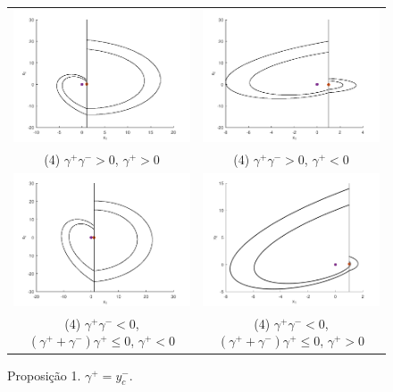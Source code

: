 \begin{figure}[H]
\centering
\begin{table}[H]
\centering
\begin{tabular}{cc}
\includegraphics[width=6cm]{1_4_2_greater}
&
\includegraphics[width=6cm]{1_4_2_lesser}\\
\small(4) $\gamma^+\gamma^->0$, $\gamma^+>0$&\small(4) $\gamma^+\gamma^->0$, $\gamma^+<0$\\
\includegraphics[width=6cm]{1_4_3_plus_negative}
&
\includegraphics[width=6cm]{1_4_3_plus_positive}\\
\small(4) $\gamma^+\gamma^-<0$, $(\gamma^++\gamma^-)\gamma^+\leq0$, $\gamma^+<0$&\small(4) $\gamma^+\gamma^-<0$, $(\gamma^++\gamma^-)\gamma^+\leq0$, $\gamma^+>0$
\end{tabular}
\end{table}
\caption{\label{prep1}Proposição 1. $\gamma^+=y_c^-$.}
\end{figure}

